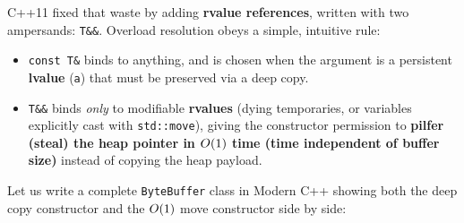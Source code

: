 C++11 fixed that waste by adding \textbf{rvalue references}, written with two ampersands: \texttt{T\&\&}. Overload resolution obeys a simple, intuitive rule:
\begin{itemize}
  \item \texttt{const T\&} binds to anything, and is chosen when the argument is a persistent \textbf{lvalue} (\texttt{a}) that must be preserved via a deep copy.
  \item \texttt{T\&\&} binds \emph{only} to modifiable \textbf{rvalues} (dying temporaries, or variables explicitly cast with \texttt{std::move}), giving the constructor permission to \textbf{pilfer (steal) the heap pointer in $O(1)$ time (time independent of buffer size)} instead of copying the heap payload.
\end{itemize}

Let us write a complete \texttt{ByteBuffer} class in Modern C++ showing both the deep copy constructor and the $O(1)$ move constructor side by side:

